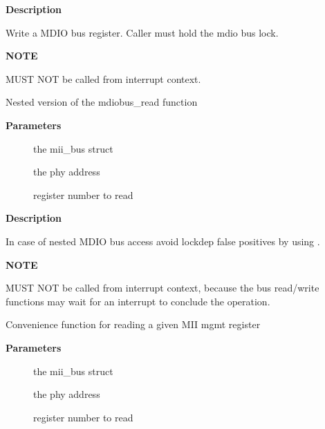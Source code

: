 \documentclass[a4paper,8pt,english]{sphinxmanual}
\begin{document}
\textbf{Description}

Write a MDIO bus register. Caller must hold the mdio bus lock.

\textbf{NOTE}

MUST NOT be called from interrupt context.

\begin{fulllineitems}
\label{networking/kapi:c.mdiobus_read_nested}
Nested version of the mdiobus\_read function

\end{fulllineitems}


\textbf{Parameters}
\begin{description}
\item[{}] \leavevmode
the mii\_bus struct

\item[{}] \leavevmode
the phy address

\item[{}] \leavevmode
register number to read

\end{description}

\textbf{Description}

In case of nested MDIO bus access avoid lockdep false positives by
using .

\textbf{NOTE}

MUST NOT be called from interrupt context,
because the bus read/write functions may wait for an interrupt
to conclude the operation.

\begin{fulllineitems}
\label{networking/kapi:c.mdiobus_read}
Convenience function for reading a given MII mgmt register

\end{fulllineitems}


\textbf{Parameters}
\begin{description}
\item[{}] \leavevmode
the mii\_bus struct

\item[{}] \leavevmode
the phy address

\item[{}] \leavevmode
register number to read

\end{description}
\end{document}
